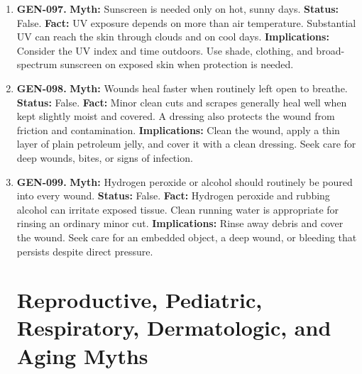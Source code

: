 \documentclass[11pt,oneside]{book}
\begin{document}
\begin{enumerate}[leftmargin=0pt,labelwidth=0pt,labelsep=0pt,itemindent=0pt]
\textbf{Implications:} Use shade, protective clothing, and sunscreen instead of trying to develop a protective tan.
\item[] \textbf{GEN-097.} \textbf{Myth:} Sunscreen is needed only on hot, sunny days.\newline
\textbf{Status:} False.\newline
\textbf{Fact:} UV exposure depends on more than air temperature. Substantial UV can reach the skin through clouds and on cool days. \cite{ref319}\newline
\textbf{Implications:} Consider the UV index and time outdoors. Use shade, clothing, and broad-spectrum sunscreen on exposed skin when protection is needed.
\item[] \textbf{GEN-098.} \textbf{Myth:} Wounds heal faster when routinely left open to breathe.\newline
\textbf{Status:} False.\newline
\textbf{Fact:} Minor clean cuts and scrapes generally heal well when kept slightly moist and covered. A dressing also protects the wound from friction and contamination. \cite{ref307}\newline
\textbf{Implications:} Clean the wound, apply a thin layer of plain petroleum jelly, and cover it with a clean dressing. Seek care for deep wounds, bites, or signs of infection.
\item[] \textbf{GEN-099.} \textbf{Myth:} Hydrogen peroxide or alcohol should routinely be poured into every wound.\newline
\textbf{Status:} False.\newline
\textbf{Fact:} Hydrogen peroxide and rubbing alcohol can irritate exposed tissue. Clean running water is appropriate for rinsing an ordinary minor cut. \cite{ref320}\newline
\textbf{Implications:} Rinse away debris and cover the wound. Seek care for an embedded object, a deep wound, or bleeding that persists despite direct pressure.

\section{Reproductive, Pediatric, Respiratory, Dermatologic, and Aging Myths}


\end{enumerate}
\end{document}
